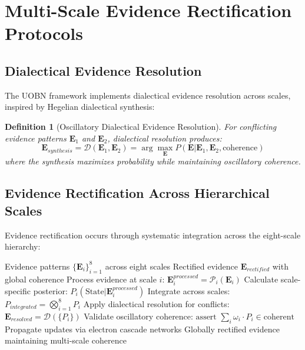 \documentclass[12pt,a4paper]{article}
\newtheorem{definition}[theorem]{Definition}
\begin{document}
\section{Multi-Scale Evidence Rectification Protocols}

\subsection{Dialectical Evidence Resolution}

The UOBN framework implements dialectical evidence resolution across scales, inspired by Hegelian dialectical synthesis:

\begin{definition}[Oscillatory Dialectical Evidence Resolution]
For conflicting evidence patterns $\mathbf{E}_1$ and $\mathbf{E}_2$, dialectical resolution produces:
\begin{equation}
\mathbf{E}_{synthesis} = \mathcal{D}(\mathbf{E}_1, \mathbf{E}_2) = \arg\max_{\mathbf{E}} P(\mathbf{E}|\mathbf{E}_1, \mathbf{E}_2, \text{coherence})
\end{equation}
where the synthesis maximizes probability while maintaining oscillatory coherence.
\end{definition}

\subsection{Evidence Rectification Across Hierarchical Scales}

Evidence rectification occurs through systematic integration across the eight-scale hierarchy:

\begin{algorithm}
\caption{Multi-Scale Evidence Rectification}
\begin{algorithmic}[1]
\REQUIRE Evidence patterns $\{\mathbf{E}_i\}_{i=1}^{8}$ across eight scales
\ENSURE Rectified evidence $\mathbf{E}_{rectified}$ with global coherence
    \STATE Process evidence at scale $i$: $\mathbf{E}_i^{processed} = \mathcal{P}_i(\mathbf{E}_i)$
    \STATE Calculate scale-specific posterior: $P_i(\text{State}|\mathbf{E}_i^{processed})$
\ENDFOR
\STATE Integrate across scales: $P_{integrated} = \bigotimes_{i=1}^{8} P_i$
\STATE Apply dialectical resolution for conflicts: $\mathbf{E}_{resolved} = \mathcal{D}(\{P_i\})$
\STATE Validate oscillatory coherence: $\text{assert } \sum_i \omega_i \cdot P_i \in \text{coherent}$
\STATE Propagate updates via electron cascade networks
\RETURN Globally rectified evidence maintaining multi-scale coherence
\end{algorithmic}
\end{algorithm}
\end{document}
